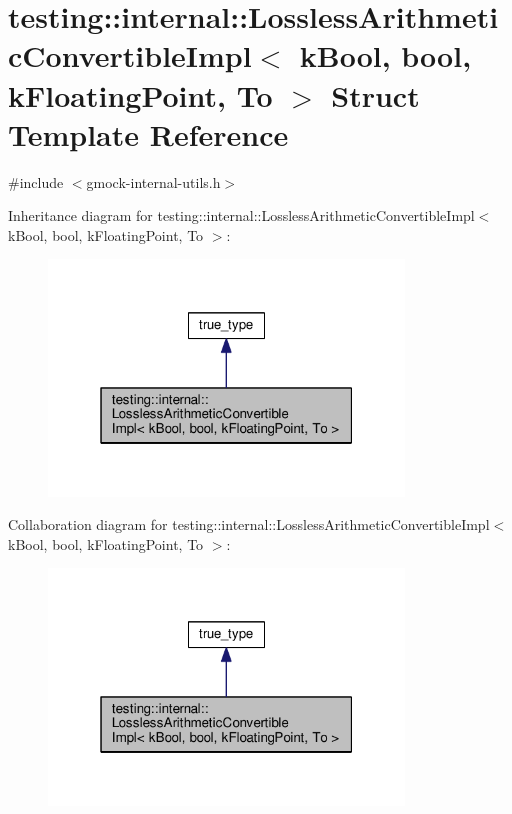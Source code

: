 \hypertarget{structtesting_1_1internal_1_1LosslessArithmeticConvertibleImpl_3_01kBool_00_01bool_00_01kFloatingPoint_00_01To_01_4}{}\section{testing\+:\+:internal\+:\+:Lossless\+Arithmetic\+Convertible\+Impl$<$ k\+Bool, bool, k\+Floating\+Point, To $>$ Struct Template Reference}
\label{structtesting_1_1internal_1_1LosslessArithmeticConvertibleImpl_3_01kBool_00_01bool_00_01kFloatingPoint_00_01To_01_4}


{\ttfamily \#include $<$gmock-\/internal-\/utils.\+h$>$}



Inheritance diagram for testing\+:\+:internal\+:\+:Lossless\+Arithmetic\+Convertible\+Impl$<$ k\+Bool, bool, k\+Floating\+Point, To $>$\+:\nopagebreak
\begin{figure}[H]
\begin{center}
\leavevmode
\includegraphics[width=268pt]{structtesting_1_1internal_1_1LosslessArithmeticConvertibleImpl_3_01kBool_00_01bool_00_01kFloatince672614b5e4e46715c5e62532c0176f}
\end{center}
\end{figure}


Collaboration diagram for testing\+:\+:internal\+:\+:Lossless\+Arithmetic\+Convertible\+Impl$<$ k\+Bool, bool, k\+Floating\+Point, To $>$\+:\nopagebreak
\begin{figure}[H]
\begin{center}
\leavevmode
\includegraphics[width=268pt]{structtesting_1_1internal_1_1LosslessArithmeticConvertibleImpl_3_01kBool_00_01bool_00_01kFloatin65e9ed9ffc0392398afd333699bbfc13}
\end{center}
\end{figure}
